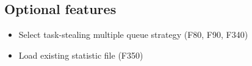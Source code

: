 {	\subsection{Optional features}
			\begin{itemize}
				\item Select task-stealing multiple queue strategy (F80, F90, F340)
				\item Load existing statistic file (F350)
			\end{itemize}
		
}